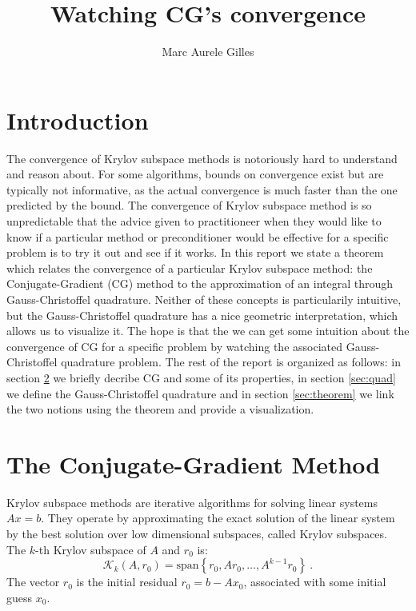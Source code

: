 \documentclass[10pt,a4paper]{article}
\begin{document}
\title{Watching CG's convergence }
\author{Marc Aurele Gilles}
\maketitle

\section{Introduction}

The convergence of Krylov subspace methods is notoriously hard to understand and reason about. For some algorithms, bounds on convergence exist but are typically not informative, as the actual convergence is much faster than the one predicted by the bound. The convergence of Krylov subspace method is so unpredictable that the advice given to practitioneer when they would like to know if a particular method or preconditioner would be effective for a specific problem is to try it out and see if it works. In this report we state a theorem which relates the convergence of a particular Krylov subspace method: the Conjugate-Gradient (CG) method to the approximation of an integral through Gauss-Christoffel quadrature. 
Neither of these concepts is particularily intuitive, but the Gauss-Christoffel quadrature has a nice geometric interpretation, which allows us to visualize it. The hope is that the we can get some intuition about the convergence of CG for a specific problem by watching the associated Gauss-Christoffel quadrature problem.
The rest of the report is organized as follows: in section \ref{sec:CG} we briefly decribe CG and some of its properties, in section \ref{sec:quad} we define the Gauss-Christoffel quadrature and in section \ref{sec:theorem} we link the two notions using the theorem and provide a visualization.



\section{The Conjugate-Gradient Method} \label{sec:CG}

Krylov subspace methods are iterative algorithms for solving linear systems $Ax=b$. They operate by approximating the exact solution of the linear system by the best solution over low dimensional subspaces, called Krylov subspaces. The $k$-th Krylov subspace of $A$ and $r_0$ is:
\begin{equation}
\mathcal{K}_k\left( A, r_0\right) = \text{span}\left\lbrace r_0, Ar_0, \dots, A^{k-1}r_0 \right\rbrace \ .
\end{equation} 
The vector $r_0$ is the initial residual $r_0 = b - Ax_0$, associated with some initial guess $x_0$.
\end{document}
